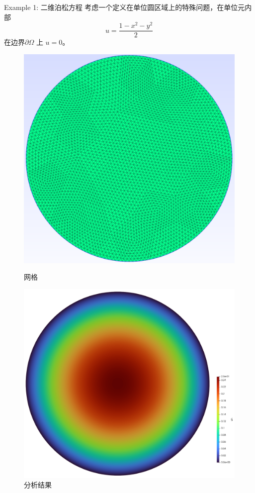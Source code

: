 \documentclass[lang=en,aspectratio=43,theme=default,logo=on]{simplebeamer}
\begin{document}
\begin{frame}{Example 1: 二维泊松方程}
 	考虑一个定义在单位圆区域上的特殊问题，在单位元内部
 	\[
 	u = \dfrac{1-x^2-y^2}{2}
 	\]
 	在边界$\partial \Omega$ 上 $u=0$。

 	\begin{figure}
 		\centering %
 		\begin{minipage}[t]{0.5\linewidth}
 			\centering
 			\includegraphics[height=0.5\textheight]{./img/001.png}
 			\caption{网格}
 		\end{minipage}%
 		\begin{minipage}[t]{0.5\linewidth}
 			\centering
 			\includegraphics[height=0.5\textheight]{./img/002.png}
 			\caption{分析结果}
 		\end{minipage}
 	\end{figure}

\end{frame}
\end{document}

